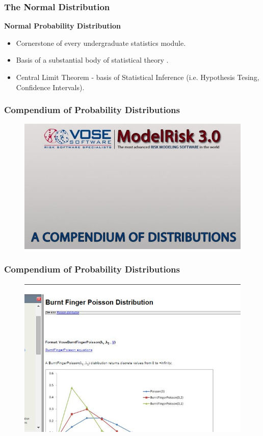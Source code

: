 \documentclass[MAIN.tex]{subfiles}
\begin{document}
\begin{frame}
\frametitle{The Normal Distribution}
\textbf{Normal Probability Distribution}
\large
\begin{itemize}
\item Cornerstone of every undergraduate statistics module.
\item Basis of a substantial body of statistical theory
.\item Central Limit Theorem - basis of Statistical Inference (i.e. Hypothesis Tesing, Confidence Intervals).

\end{itemize}
\end{frame}
\begin{frame}
\frametitle{Compendium of Probability Distributions}
\begin{figure}
\centering
\includegraphics[width=1.05\linewidth]{images/vosecompendium}
\end{figure}
\end{frame}
\begin{frame}
	\frametitle{Compendium of Probability Distributions}
		\begin{figure}
\centering
\includegraphics[width=0.9\linewidth]{images/burntfinger}

\end{figure}

\end{frame}
\end{document}
